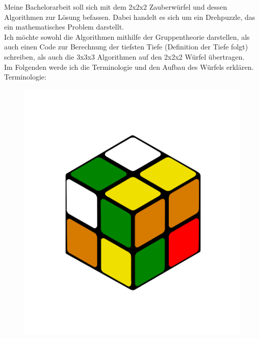 \documentclass[12pt,a4paper, usenames, dvipsnames]{scrartcl}
\begin{document}
Meine Bachelorarbeit soll sich mit dem 2x2x2 Zauberwürfel und dessen Algorithmen zur Lösung befassen. Dabei handelt es sich um ein Drehpuzzle, das ein mathematisches Problem darstellt. \\ 
Ich möchte sowohl die Algorithmen mithilfe der Gruppentheorie darstellen, als auch einen Code zur Berechnung der tiefsten Tiefe (Definition der Tiefe folgt) schreiben, als auch die 3x3x3 Algorithmen auf den 2x2x2 Würfel übertragen. \\
Im Folgenden werde ich die Terminologie und den Aufbau des Würfels erklären.\\
Terminologie:
\begin{figure}[h]
\centering
\includegraphics[scale=0.1]{2x2scrambled.png}

\end{figure}
\end{document}
